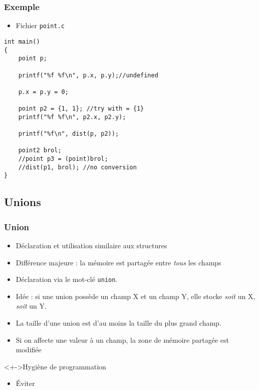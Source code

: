 \begin{frame}[containsverbatim]
\frametitle{Exemple}
\begin{itemize}
\item Fichier \texttt{point.c}
\end{itemize}
\begin{lstlisting}
int main()
{
	point p;

	printf("%f %f\n", p.x, p.y);//undefined

	p.x = p.y = 0;

	point p2 = {1, 1}; //try with = {1}
	printf("%f %f\n", p2.x, p2.y);

	printf("%f\n", dist(p, p2));

	point2 brol;
	//point p3 = (point)brol;
	//dist(p1, brol); //no conversion
}
\end{lstlisting}
\end{frame}

\subsection{Unions}

\begin{frame}
\frametitle{Union}
\begin{itemize}[<+->]
\item Déclaration et utilisation similaire aux structures
\item Différence majeure : la mémoire est partagée entre \emph{tous} les champs
\item Déclaration via le mot-clé \lstinline|union|.
\item Idée : si une union possède un champ X et un champ Y, elle stocke \emph{soit} un X, \emph{soit} un Y.
\item La taille d'une union est d'au moins la taille du plus grand champ.
\item Si on affecte une valeur à un champ, la zone de mémoire partagée est modifiée
\end{itemize}
\begin{block}<+->{Hygiène de programmation}
	\begin{itemize}[<+->]
	\item Éviter
	\end{itemize}
\end{block}
\end{frame}

